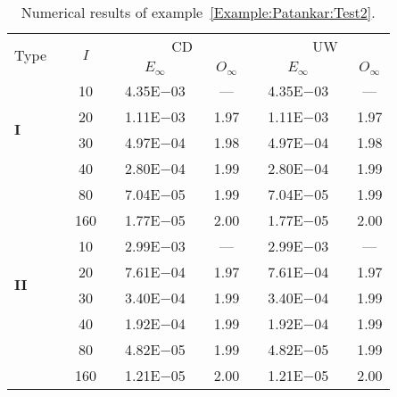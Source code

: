{\renewcommand{\baselinestretch}{1.0}
\begin{table}[H]
\caption{Numerical results of example~\ref{Example:Patankar:Test2}.}

\setlength{\tabcolsep}{5pt}
\centering
\begin{tabular}{@{}l c c c c c c c c c c@{}}
\toprule
\multirow{2}{*}{Type} &  & \multirow{2}{*}{$I$} &  & \multicolumn{3}{c}{CD} &  & \multicolumn{3}{c}{UW} \\
\cline{5-7}
\cline{9-11}
 & & & & $E_{\infty}$ & & $O_{\infty}$ & & $E_{\infty}$ & & $O_{\infty}$\\
\midrule
\multirow{4}{*}{\textbf{I}} 
 & & 10 & & 4.35E$-$03 & & --- & & 4.35E$-$03 & & ---\\
 & & 20 & & 1.11E$-$03 & & 1.97 & & 1.11E$-$03 & & 1.97\\
 & & 30 & & 4.97E$-$04 & & 1.98 & & 4.97E$-$04 & & 1.98\\
 & & 40 & & 2.80E$-$04 & & 1.99 & & 2.80E$-$04 & & 1.99\\
 & & 80 & & 7.04E$-$05 & & 1.99 & & 7.04E$-$05 & & 1.99\\
 & & 160 & & 1.77E$-$05 & & 2.00 & & 1.77E$-$05 & & 2.00\\
\midrule
\multirow{4}{*}{\textbf{II}} 
 & & 10 & & 2.99E$-$03 & & --- & & 2.99E$-$03 & & ---\\
 & & 20 & & 7.61E$-$04 & & 1.97 & & 7.61E$-$04 & & 1.97\\
 & & 30 & & 3.40E$-$04 & & 1.99 & & 3.40E$-$04 & & 1.99\\
 & & 40 & & 1.92E$-$04 & & 1.99 & & 1.92E$-$04 & & 1.99\\
 & & 80 & & 4.82E$-$05 & & 1.99 & & 4.82E$-$05 & & 1.99\\
 & & 160 & & 1.21E$-$05 & & 2.00 & & 1.21E$-$05 & & 2.00\\
\bottomrule
\end{tabular}
\label{Table:Patankar:Test2}
\end{table}}
